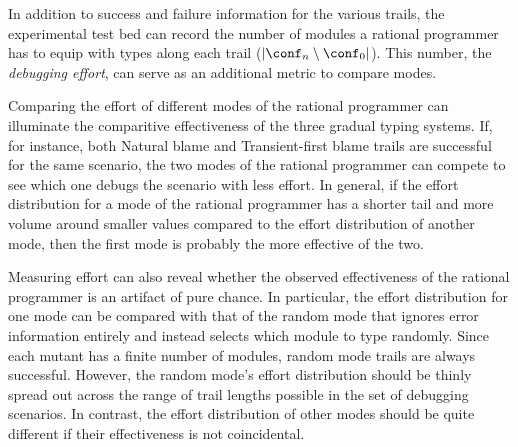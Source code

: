 
In addition to success and failure information for the various trails, the
experimental test bed can record the number of modules a rational programmer has
to equip with types along each trail ($\lvert \conf_n \setminus \conf_0
\rvert$). This number, the \emph{debugging effort}, can serve as an additional metric to compare modes.

Comparing the effort of different modes of the rational programmer can
illuminate the comparitive effectiveness of the three gradual typing
systems. If, for instance, both
Natural blame and Transient-first blame trails are successful for the same scenario, the two modes of
the rational programmer can compete to see which one debugs the
scenario with less effort. In general, if the effort distribution for a mode of
the rational programmer has a shorter tail and more volume around smaller values
compared to the effort distribution of another mode, then the first mode is
probably the more effective of the two.

Measuring effort can also reveal whether the observed effectiveness of the
rational programmer is an artifact of pure chance.
In particular, the effort distribution for one mode can be compared with that of
the random mode that ignores error information entirely and instead selects which
module to type randomly.  Since each mutant has a finite number of
modules, random mode trails are always successful. However, the random mode's effort
distribution should be thinly spread out across the range of trail lengths possible
in the set of debugging scenarios.
In contrast, the effort distribution of other modes should be quite different if their effectiveness is not coincidental.
